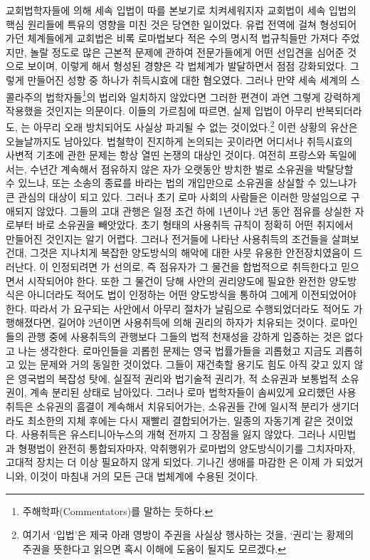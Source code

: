 교회법학자들에 의해 세속 입법이 따를 본보기로 치켜세워지자
교회법이 세속 입법의
핵심 원리들에 특유의 영향을 미친 것은 당연한 일이었다.
유럽 전역에 걸쳐 형성되어가던  체계들에게 교회법은
비록 로마법보다 적은 수의 명시적 법규칙들만 가져다 주었지만,
놀랄 정도로 많은 근본적 문제에 관하여
전문가들에게 어떤 선입견을 심어준 것으로 보이며,
이렇게 해서 형성된 경향은 각 법체계가 발달하면서 점점 강화되었다.
그렇게 만들어진 성향 중 하나가 취득시효에 대한 혐오였다.
그러나 만약
세속 세계의
스콜라주의 법학자들\footnote{%
  주해학파(Commentators)를 말하는 듯하다.
}의
법리와 일치하지 않았다면
그러한 편견이
과연 그렇게 강력하게 작용했을 것인지는 의문이다.
이들의 가르침에 따르면,
실제 입법이 아무리 반복되더라도,
는 아무리 오래 방치되어도
사실상 파괴될 수 없는 것이었다.\footnote{%
  여기서 `입법'은 제국 아래 영방이 주권을 사실상 행사하는 것을,
  `권리'는 황제의 주권을 뜻한다고 읽으면 혹시 이해에 도움이 될지도 모르겠다.
  }
이런 상황의 유산은 오늘날까지도 남아있다.
법철학이 진지하게 논의되는 곳이라면 어디서나
취득시효의 사변적 기초에 관한 문제는 항상 열띤 논쟁의 대상인 것이다.
여전히 프랑스와 독일에서는,
수년간 계속해서 점유하지 않은 자가
오랫동안 방치한 벌로
소유권을 박탈당할 수 있느냐,
또는 소송의 종료를 바라는 법의 개입만으로
소유권을 상실할 수 있느냐가
큰 관심의 대상이 되고 있다.
그러나 초기 로마 사회의 사람들은 이러한 망설임으로 구애되지 않았다.
그들의 고대 관행은
일정 조건 하에 1년이나 2년 동안 점유를 상실한 자로부터
바로 소유권을 빼앗았다.
초기 형태의 사용취득 규칙이 정확히 어떤 취지에서 만들어진 것인지는
알기 어렵다.
그러나 전거들에 나타난 사용취득의 조건들을 살펴보건대,
그것은 지나치게 복잡한 양도방식의 해악에 대한 사뭇 유용한 안전장치였음이
드러난다.
이 인정되려면
가 선의로,
즉 점유자가 그 물건을 합법적으로 취득한다고 믿으면서
시작되어야 한다.
또한 그 물건이
당해 사안의 권리양도에 필요한 완전한 양도방식은 아니더라도
적어도 법이 인정하는
어떤 양도방식을 통하여 그에게 이전되었어야 한다.
따라서 가 요구되는 사안에서
아무리 절차가 날림으로 수행되었더라도
적어도 가 행해졌다면,
길어야 2년이면 사용취득에 의해 권리의 하자가 치유되는 것이다.
로마인들의 관행 중에 사용취득의 관행보다
그들의 법적 천재성을 강하게 입증하는 것은 없다고 나는 생각한다.
로마인들을 괴롭힌 문제는 영국 법률가들을 괴롭혔고
지금도 괴롭히고 있는 문제와 거의 동일한 것이었다.
그들이 재건축할 용기도 힘도 아직 갖고 있지 않은
영국법의 복잡성 탓에,
실질적 권리와 법기술적 권리가,
적 소유권과 보통법적 소유권이,
계속 분리된 상태로 남아있다.
그러나 로마 법학자들이 솜씨있게 요리했던 사용취득은
소유권의 흠결이 계속해서 치유되어가는,
소유권들 간에 일시적 분리가 생기더라도
최소한의 지체 후에는 다시 재빨리 결합되어가는,
일종의 자동기계 같은 것이었다.
사용취득은 유스티니아누스의 개혁 전까지
그 장점을 잃지 않았다.
그러나 시민법과 형평법이 완전히 통합되자마자,
악취행위가 로마법의 양도방식이기를 그치자마자,
고대적 장치는 더 이상 필요하지 않게 되었다.
기나긴 생애를 마감한
은
이제
가 되었거니와,
이것이 마침내 거의 모든 근대 법체계에 수용된 것이다.

